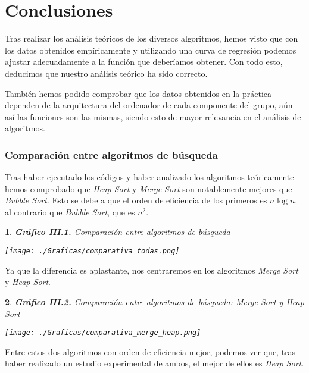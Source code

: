 \documentclass[10pt, a4paper]{article}
\theoremstyle{theorem-style}
\newtheorem*{datos}{}
\theoremstyle{theorem-style}
\theoremstyle{definition-style}
\theoremstyle{remark-style}
\theoremstyle{example-style}
\theoremstyle{definition-style}
\theoremstyle{remark-style}
\begin{document}
\pagebreak
\part{Conclusiones}

Tras realizar los análisis teóricos de los diversos algoritmos, hemos visto que con los datos obtenidos empíricamente y utilizando una curva de regresión podemos ajustar adecuadamente a la función que deberíamos obtener. Con todo esto, deducimos que nuestro análisis teórico ha sido correcto. 

También hemos podido comprobar que los datos obtenidos en la práctica dependen de la arquitectura del ordenador de cada componente del grupo, aún así las funciones son las mismas, siendo esto de mayor relevancia en el análisis de algoritmos.

\section*{Comparación entre algoritmos de búsqueda}
Tras haber ejecutado los códigos y haber analizado los algoritmos teóricamente hemos comprobado que \emph{Heap Sort} y \emph{Merge Sort} son notablemente mejores que \emph{Bubble Sort}. Esto se debe a que el orden de eficiencia de los primeros es $n\log n$, al contrario que \emph{Bubble Sort}, que es $n^2$.

\begin{datos}
	{\bf\sffamily Gráfico III.1.} {\sffamily Comparación entre algoritmos de búsqueda}\\
	\vspace{-0.7cm}
	\begin{center}
		\texttt{[image: ./Graficas/comparativa\_todas.png]}
	\end{center}	
\end{datos}

Ya que la diferencia es aplastante, nos centraremos en los algoritmos \emph{Merge Sort} y \emph{Heap Sort}.
\pagebreak
\begin{datos}
	{\bf\sffamily Gráfico III.2.} {\sffamily Comparación entre algoritmos de búsqueda: \emph{Merge Sort} y \emph{Heap Sort}}\\
	\vspace{-0.7cm}
	\begin{center}
		\texttt{[image: ./Graficas/comparativa\_merge\_heap.png]}
	\end{center}
\end{datos}
Entre estos dos algoritmos con orden de eficiencia mejor, podemos ver que, tras haber realizado un estudio experimental de ambos, el mejor de ellos es \emph{Heap Sort}.
\end{document}
